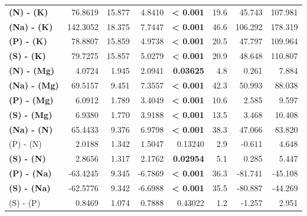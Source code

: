 \begin{table}[H]
\begin{tabular}[t]{>{}lrrr>{}rrrr}
\textbf{(N) - (K)} & 76.8619 & 15.877 & 4.8410 & \textbf{< 0.001} & 19.6 & 45.743 & 107.981\\
\textbf{(Na) - (K)} & 142.3052 & 18.375 & 7.7447 & \textbf{< 0.001} & 46.6 & 106.292 & 178.319\\
\textbf{(P) - (K)} & 78.8807 & 15.859 & 4.9738 & \textbf{< 0.001} & 20.5 & 47.797 & 109.964\\
\textbf{(S) - (K)} & 79.7275 & 15.857 & 5.0279 & \textbf{< 0.001} & 20.9 & 48.648 & 110.807\\
\textbf{(N) - (Mg)} & 4.0724 & 1.945 & 2.0941 & \textbf{0.03625} & 4.8 & 0.261 & 7.884\\
\textbf{(Na) - (Mg)} & 69.5157 & 9.451 & 7.3557 & \textbf{< 0.001} & 42.3 & 50.993 & 88.038\\
\textbf{(P) - (Mg)} & 6.0912 & 1.789 & 3.4049 & \textbf{< 0.001} & 10.6 & 2.585 & 9.597\\
\textbf{(S) - (Mg)} & 6.9380 & 1.770 & 3.9188 & \textbf{< 0.001} & 13.5 & 3.468 & 10.408\\
\textbf{(Na) - (N)} & 65.4433 & 9.376 & 6.9798 & \textbf{< 0.001} & 38.3 & 47.066 & 83.820\\
(P) - (N) & 2.0188 & 1.342 & 1.5047 & 0.13240 & 2.9 & -0.611 & 4.648\\
\textbf{(S) - (N)} & 2.8656 & 1.317 & 2.1762 & \textbf{0.02954} & 5.1 & 0.285 & 5.447\\
\textbf{(P) - (Na)} & -63.4245 & 9.345 & -6.7869 & \textbf{< 0.001} & 36.3 & -81.741 & -45.108\\
\textbf{(S) - (Na)} & -62.5776 & 9.342 & -6.6988 & \textbf{< 0.001} & 35.5 & -80.887 & -44.269\\
(S) - (P) & 0.8469 & 1.074 & 0.7888 & 0.43022 & 1.2 & -1.257 & 2.951\\
\bottomrule
\end{tabular}
\end{table}
